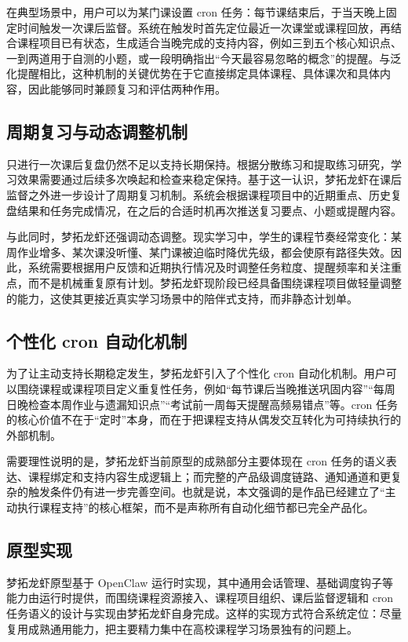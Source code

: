 \documentclass[zihao=-4]{ctexart}
\begin{document}
在典型场景中，用户可以为某门课设置 cron 任务：每节课结束后，于当天晚上固定时间触发一次课后监督。系统在触发时首先定位最近一次课堂或课程回放，再结合课程项目已有状态，生成适合当晚完成的支持内容，例如三到五个核心知识点、一到两道用于自测的小题，或一段明确指出“今天最容易忽略的概念”的提醒。与泛化提醒相比，这种机制的关键优势在于它直接绑定具体课程、具体课次和具体内容，因此能够同时兼顾复习和评估两种作用。

\subsection{周期复习与动态调整机制}
只进行一次课后复盘仍然不足以支持长期保持。根据分散练习和提取练习研究，学习效果需要通过后续多次唤起和检查来稳定保持\cite{cepeda2006,dunlosky2013,karpicke2011}。基于这一认识，梦拓龙虾在课后监督之外进一步设计了周期复习机制。系统会根据课程项目中的近期重点、历史复盘结果和任务完成情况，在之后的合适时机再次推送复习要点、小题或提醒内容。

与此同时，梦拓龙虾还强调动态调整。现实学习中，学生的课程节奏经常变化：某周作业增多、某次课没听懂、某门课被迫临时降优先级，都会使原有路径失效。因此，系统需要根据用户反馈和近期执行情况及时调整任务粒度、提醒频率和关注重点，而不是机械重复原有计划。梦拓龙虾现阶段已经具备围绕课程项目做轻量调整的能力，这使其更接近真实学习场景中的陪伴式支持，而非静态计划单。

\subsection{个性化 cron 自动化机制}
为了让主动支持长期稳定发生，梦拓龙虾引入了个性化 cron 自动化机制。用户可以围绕课程或课程项目定义重复性任务，例如“每节课后当晚推送巩固内容”“每周日晚检查本周作业与遗漏知识点”“考试前一周每天提醒高频易错点”等。cron 任务的核心价值不在于“定时”本身，而在于把课程支持从偶发交互转化为可持续执行的外部机制。

需要理性说明的是，梦拓龙虾当前原型的成熟部分主要体现在 cron 任务的语义表达、课程绑定和支持内容生成逻辑上；而完整的产品级调度链路、通知通道和更复杂的触发条件仍有进一步完善空间。也就是说，本文强调的是作品已经建立了“主动执行课程支持”的核心框架，而不是声称所有自动化细节都已完全产品化。

\subsection{原型实现}
梦拓龙虾原型基于 OpenClaw 运行时实现，其中通用会话管理、基础调度钩子等能力由运行时提供，而围绕课程资源接入、课程项目组织、课后监督逻辑和 cron 任务语义的设计与实现由梦拓龙虾自身完成。这样的实现方式符合系统定位：尽量复用成熟通用能力，把主要精力集中在高校课程学习场景独有的问题上。
\end{document}
